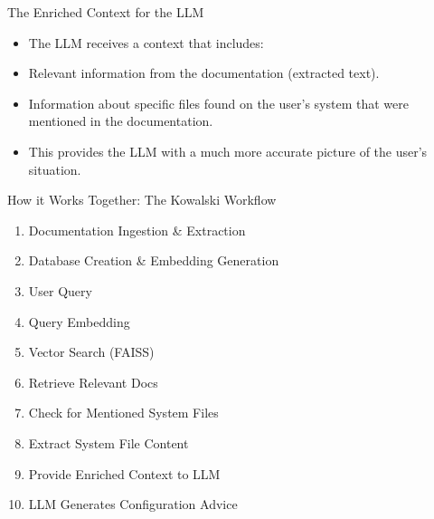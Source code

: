 \documentclass[aspectratio=169]{beamer}
\begin{document}
\begin{frame}{The Enriched Context for the LLM}
  \begin{itemize}
    \item The LLM receives a context that includes:
    \item Relevant information from the documentation (extracted text).
    \item Information about specific files found on the user's system that were mentioned in the documentation.
    \item This provides the LLM with a much more accurate picture of the user's situation.
  \end{itemize}
\end{frame}

\begin{frame}{How it Works Together: The Kowalski Workflow}
  \begin{enumerate}
    \item Documentation Ingestion \& Extraction
    \item Database Creation \& Embedding Generation
    \item User Query
    \item Query Embedding
    \item Vector Search (FAISS)
    \item Retrieve Relevant Docs
    \item Check for Mentioned System Files
    \item Extract System File Content
    \item Provide Enriched Context to LLM
    \item LLM Generates Configuration Advice
  \end{enumerate}
\end{frame}

\end{document}
